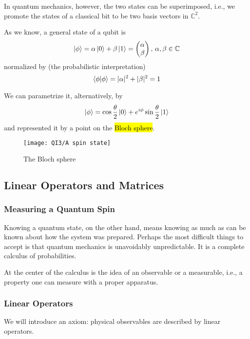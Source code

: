 In quantum mechanics, however, the two states can be superimposed, i.e., we promote the states of a classical bit to be two basis vectors in $\mathbb{C}^2$.

As we know, a general state of a qubit is
\begin{align*}
    \ket{\phi}=\alpha\ket{0}+\beta\ket{1}=\begin{pmatrix}
        \alpha \\ \beta
    \end{pmatrix}, \, \alpha, \beta\in \mathbb{C}
\end{align*}
normalized by (the probabilistic interpretation)
\begin{align*}
    \braket{\phi | \phi }=|\alpha|^2+|\beta|^2=1
\end{align*}

We can parametrize it, alternatively, by
\begin{align*}
    \ket{\phi}=\cos\frac{\theta}{2}\ket{0}+e^{i\phi}\sin\frac{\theta}{2}\ket{1}
\end{align*}
and represented it by a point on the \hl{Bloch sphere}.

\begin{figure}[H]
    \centering
    \texttt{[image: QI3/A spin state]}
    \caption{The Bloch sphere}
\end{figure}

\subsection{Linear Operators and Matrices}

\subsubsection{Measuring a Quantum Spin}

Knowing a quantum state, on the other hand, means knowing as much as can be known about how the system was prepared. Perhaps the most difficult things to accept is that quantum mechanics is unavoidably unpredictable. It is a complete calculus of probabilities.

At the center of the calculus is the idea of an observable or a measurable, i.e., a property one can measure with a proper apparatus. 

\subsubsection{Linear Operators}
We will introduce an axiom: physical observables are described by linear operators.

